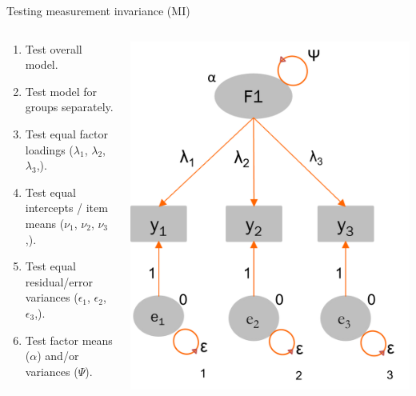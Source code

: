\documentclass[10pt]{beamer}\usepackage[]{graphicx}\usepackage[]{xcolor}
\begin{document}
%
\begin{frame}{Testing measurement invariance (MI)}

    \begin{columns}[T] %
    \begin{column}{.75\textwidth}

        \begin{enumerate}
            \item Test overall model.
            \item Test model for groups separately.
            \item Test equal factor loadings ($\lambda_1$, $\lambda_2$, $\lambda_3$,).
            \item Test equal intercepts / item means ($\nu_1$, $\nu_2$, $\nu_3$,).
            \item Test equal residual/error variances ($\epsilon_1$, $\epsilon_2$, $\epsilon_3$,).
            \item Test factor means ($\alpha$) and/or variances ($\Psi$).
        \end{enumerate}
    \end{column}%

    \hfill%
    \begin{column}{.24\textwidth}

\includegraphics[width=\textwidth,keepaspectratio]{images/FactorModel.png}


\end{column}
\end{columns}
\end{frame}
\end{document}
